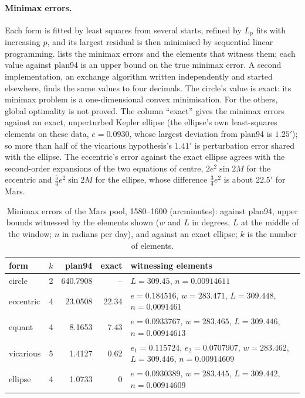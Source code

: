 \paragraph{Minimax errors.} Each form is fitted by least squares from several starts, refined by $L_p$ fits with increasing $p$, and its largest residual is then minimised by sequential linear programming.  lists the minimax errors and the elements that witness them; each value against plan94 is an upper bound on the true minimax error. A second implementation, an exchange algorithm written independently and started elsewhere, finds the same values to four decimals. The circle's value is exact: its minimax problem is a one-dimensional convex minimisation. For the others, global optimality is not proved. The column ``exact'' gives the minimax errors against an exact, unperturbed Kepler ellipse (the ellipse's own least-squares elements on these data, $e=0.0930$, whose largest deviation from plan94 is $1.25'$); so more than half of the vicarious hypothesis's $1.41'$ is perturbation error shared with the ellipse. The eccentric's error against the exact ellipse agrees with the second-order expansions of the two equations of centre, $2e^2\sin2M$ for the eccentric and $\frac54e^2\sin2M$ for the ellipse, whose difference $\frac34e^2$ is about $22.5'$ for Mars.

\begin{table}[ht]
\centering\small
\caption{Minimax errors of the Mars pool, 1580--1600 (arcminutes): against plan94, upper bounds witnessed by the elements shown ($w$ and $L$ in degrees, $L$ at the middle of the window; $n$ in radians per day), and against an exact ellipse; $k$ is the number of elements.}\label{tab:kepler:minimax}
\setlength{\tabcolsep}{3pt}
\begin{tabularx}{\textwidth}{@{}lrrr>{\raggedright\arraybackslash}X@{}}
\toprule
form & $k$ & plan94 & exact & witnessing elements\\
\midrule
circle & 2 & 640.7908 & -- & $L=309.45$, $n=0.00914611$\\
eccentric & 4 & 23.0508 & 22.34 & $e=0.184516$, $w=283.471$, $L=309.448$, $n=0.0091461$\\
equant & 4 & 8.1653 & 7.43 & $e=0.0933767$, $w=283.465$, $L=309.446$, $n=0.00914613$\\
vicarious & 5 & 1.4127 & 0.62 & $e_1=0.115724$, $e_2=0.0707907$, $w=283.462$, $L=309.446$, $n=0.00914609$\\
ellipse & 4 & 1.0733 & 0 & $e=0.0930389$, $w=283.445$, $L=309.442$, $n=0.00914609$\\
\bottomrule
\end{tabularx}
\end{table}

